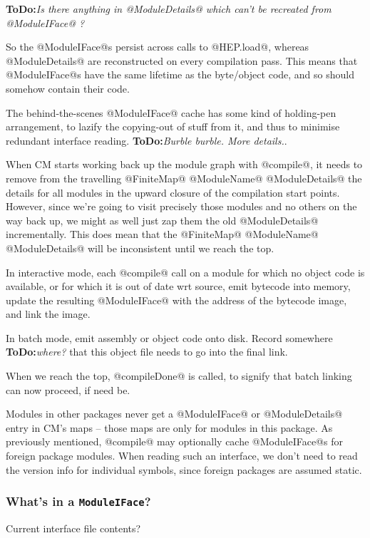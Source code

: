 \documentclass[11pt]{article}
\newcommand{\ToDo}[1]{{{\bf ToDo:}\sl #1}}
\begin{document}
\ToDo{Is there anything in @ModuleDetails@ which can't be
      recreated from @ModuleIFace@ ?}

So the @ModuleIFace@s persist across calls to @HEP.load@, whereas
@ModuleDetails@ are reconstructed on every compilation pass.  This
means that @ModuleIFace@s have the same lifetime as the byte/object
code, and so should somehow contain their code.

The behind-the-scenes @ModuleIFace@ cache has some kind of holding-pen
arrangement, to lazify the copying-out of stuff from it, and thus to
minimise redundant interface reading.  \ToDo{Burble burble.  More
details.}.

When CM starts working back up the module graph with @compile@, it
needs to remove from the travelling @FiniteMap@ @ModuleName@
@ModuleDetails@ the details for all modules in the upward closure of
the compilation start points.  However, since we're going to visit
precisely those modules and no others on the way back up, we might as
well just zap them the old @ModuleDetails@ incrementally.  This does
mean that the @FiniteMap@ @ModuleName@ @ModuleDetails@ will be
inconsistent until we reach the top.

In interactive mode, each @compile@ call on a module for which no
object code is available, or for which it is out of date wrt source,
emit bytecode into memory, update the resulting @ModuleIFace@ with the
address of the bytecode image, and link the image.

In batch mode, emit assembly or object code onto disk.  Record
somewhere \ToDo{where?} that this object file needs to go into the
final link.

When we reach the top, @compileDone@ is called, to signify that batch
linking can now proceed, if need be.

Modules in other packages never get a @ModuleIFace@ or @ModuleDetails@
entry in CM's maps -- those maps are only for modules in this package.
As previously mentioned, @compile@ may optionally cache @ModuleIFace@s
for foreign package modules.  When reading such an interface, we don't
need to read the version info for individual symbols, since foreign
packages are assumed static.

\subsubsection*{What's in a \mbox{\tt ModuleIFace}?}

Current interface file contents?
\end{document}
